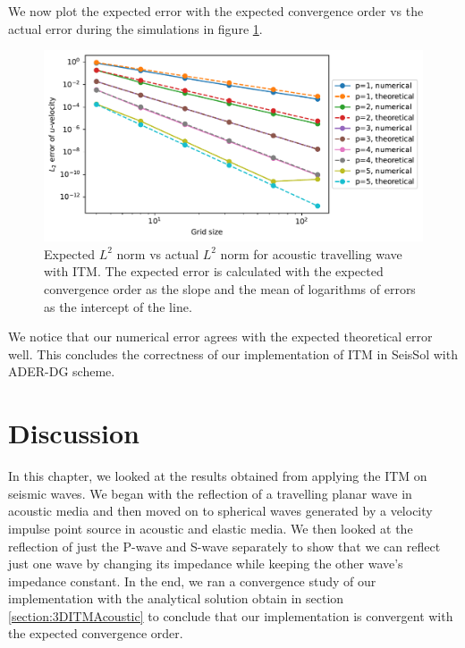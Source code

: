 We now plot the expected error with the expected convergence order vs the actual error during the simulations in figure \ref{fig:expectedvsactualerror}.

\begin{figure}
    \centering
    \includegraphics[width=\linewidth]{figures/error3.pdf}
    \caption{Expected $L^2$ norm vs actual $L^2$ norm for acoustic travelling wave with \ac{ITM}. The expected error is calculated with the expected convergence order
    as the slope and the mean of logarithms of errors as the intercept of the line.}
    \label{fig:expectedvsactualerror}
\end{figure}

We notice that our numerical error agrees with the expected theoretical error well. This concludes the correctness of our implementation of \ac{ITM} in SeisSol with \ac{ADER}-\ac{DG} scheme.

\section{Discussion}
In this chapter, we looked at the results obtained from applying the \ac{ITM} on seismic waves. We began with the reflection of a travelling planar wave in acoustic media
and then moved on to spherical waves generated by a velocity impulse point source in acoustic and elastic media. 
We then looked at the reflection of just the P-wave and S-wave separately to show that we can reflect just one wave by changing its impedance while keeping the other wave's impedance constant.
In the end, we ran a convergence study of our implementation with the analytical solution obtain in section \ref{section:3DITMAcoustic} to conclude that our implementation
is convergent with the expected convergence order. \\